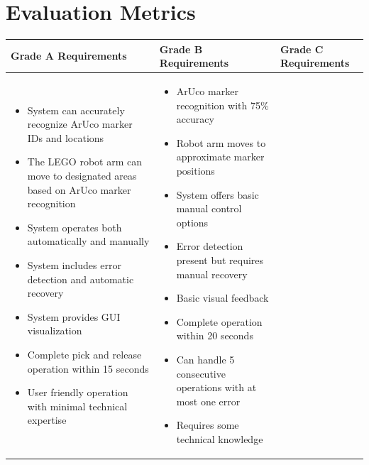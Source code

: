 \documentclass[10pt,twocolumn]{article}
\begin{document}
\section{Evaluation Metrics}

\begin{table}[t]
\begin{center}
\small
\renewcommand{\arraystretch}{1.3}  %
\begin{tabular}{|p{}|p{}|p{}|}
\hline
\normalsize\bfseries Grade A Requirements & 
\normalsize\bfseries Grade B Requirements & 
\normalsize\bfseries Grade C Requirements \\
\hline
\vspace{1mm}  %
\begin{itemize}[leftmargin=*,nosep]
    \item System can accurately recognize ArUco marker IDs and locations
    \item The LEGO robot arm can move to designated areas based on ArUco marker recognition
    \item System operates both automatically and manually
    \item System includes error detection and automatic recovery
    \item System provides GUI visualization
    \item Complete pick and release operation within 15 seconds
    \item User friendly operation with minimal technical expertise
\end{itemize}
\vspace{1mm} & 
\vspace{1mm}
\begin{itemize}[leftmargin=*,nosep]
    \item ArUco marker recognition with 75\% accuracy
    \item Robot arm moves to approximate marker positions
    \item System offers basic manual control options
    \item Error detection present but requires manual recovery
    \item Basic visual feedback
    \item Complete operation within 20 seconds
    \item Can handle 5 consecutive operations with at most one error
    \item Requires some technical knowledge
\end{itemize}

\end{tabular}
\end{center}
\end{table}
\end{document}
